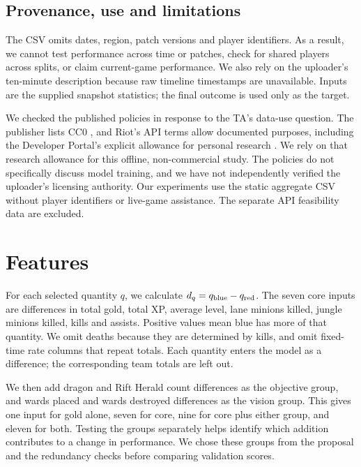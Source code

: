 \documentclass[11pt]{article}
\begin{document}
\begin{table}[t]
\centering
\small

\caption{Selected blue-minus-red features in the 6,915 training matches, before scaling. The results include the full eleven-feature summary. The ward-count spread is one reason to investigate vision measurements.}
\label{tab:data-summary}
\end{table}

\subsection{Provenance, use and limitations}
\label{sec:data-use}

The CSV omits dates, region, patch versions and player identifiers. As a result, we cannot test performance across time or patches, check for shared players across splits, or claim current-game performance. We also rely on the uploader's ten-minute description because raw timeline timestamps are unavailable. Inputs are the supplied snapshot statistics; the final outcome is used only as the target.

We checked the published policies in response to the TA's data-use question. The publisher lists CC0 \citep{ma2020}, and Riot's API terms allow documented purposes, including the Developer Portal's explicit allowance for personal research \citep{riotapiterms,riotportal}. We rely on that research allowance for this offline, non-commercial study. The policies do not specifically discuss model training, and we have not independently verified the uploader's licensing authority. Our experiments use the static aggregate CSV without player identifiers or live-game assistance. The separate API feasibility data are excluded.

\section{Features}

For each selected quantity $q$, we calculate $d_q=q_{\rm blue}-q_{\rm red}$. The seven core inputs are differences in total gold, total XP, average level, lane minions killed, jungle minions killed, kills and assists. Positive values mean blue has more of that quantity. We omit deaths because they are determined by kills, and omit fixed-time rate columns that repeat totals. Each quantity enters the model as a difference; the corresponding team totals are left out.

We then add dragon and Rift Herald count differences as the objective group, and wards placed and wards destroyed differences as the vision group. This gives one input for gold alone, seven for core, nine for core plus either group, and eleven for both. Testing the groups separately helps identify which addition contributes to a change in performance. We chose these groups from the proposal and the redundancy checks before comparing validation scores.
\end{document}
